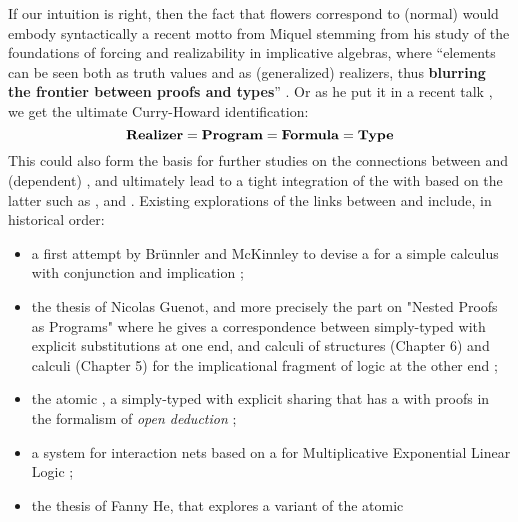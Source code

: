 \begin{scope}
If our intuition is right, then the fact that flowers correspond to (normal)
 would embody syntactically a recent motto from Miquel stemming
from his study of the foundations of forcing and realizability in implicative
algebras, where ``elements can be seen both as truth values and as (generalized)
realizers, thus \textbf{blurring the frontier between proofs and
types}'' . Or as he put it in a
recent talk \cite{miquel_implicative_topos_2022}, we get the ultimate
Curry-Howard identification:
$$
\text{\textbf{Realizer}} = \text{\textbf{Program}} = \text{\textbf{Formula}} = \text{\textbf{Type}}
$$
This could also form the basis for further studies on the connections between
 and (dependent) , and ultimately lead to a tight
integration of the  with  based on the
latter such as ,  and . Existing explorations of the
links between  and  include, in historical
order:
\begin{itemize}
  \item a first attempt by Brünnler and McKinnley to devise a  for a simple   calculus with
  conjunction and implication ;
  \item the thesis of Nicolas Guenot, and more precisely the part on "Nested
  Proofs as Programs" where he gives a correspondence between simply-typed
   with explicit substitutions at one end, and calculi of
  structures (Chapter 6) and  calculi (Chapter 5) for the
  implicational fragment of  logic at the other end
  \cite{guenot_nested_2013};
  \item the atomic , a simply-typed  with
  explicit sharing that has a  with proofs in the
  formalism of \emph{open deduction} ;
  \item a  system for interaction nets based on a  for
  Multiplicative Exponential Linear Logic ;
  \item the thesis of Fanny He, that explores a  variant of the atomic

\end{itemize}
\end{scope}
